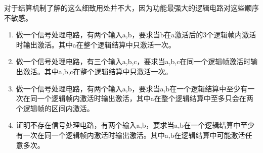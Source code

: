 对于结算机制了解的这么细致用处并不大，因为功能最强大的逻辑电路对这些顺序不敏感。

\begin{enumerate}
  \item 做一个信号处理电路，有两个输入a,b，要求当b在a激活后的3个逻辑帧内激活时输出激活。其中a在整个逻辑结算中只激活一次。
  \item 做一个信号处理电路，有三个输入a,b,c，要求当a,b,c在同一个逻辑帧激活时输出激活。其中a,b,c在整个逻辑结算中只激活一次。
  \item 做一个信号处理电路，有两个输入a,b，要求当a,b在一个逻辑结算中至少有一次在同一个逻辑帧内激活时输出激活，其中a在整个逻辑结算中至多只会在两个逻辑帧的区间内激活。
  \item 证明不存在信号处理电路，有两个输入a,b，要求当a,b在一个逻辑结算中至少有一次在同一个逻辑帧内激活时输出激活。其中a,b在逻辑结算中可能激活任意多次。
\end{enumerate}
